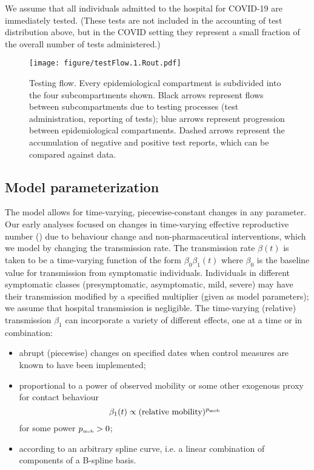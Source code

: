 \documentclass[12pt]{article}\usepackage[]{graphicx}\usepackage[]{color}
\begin{document}
We assume that all individuals admitted to the hospital for COVID-19 are immediately tested. (These tests are not included in the accounting of test distribution above, but in the COVID setting they represent a small fraction of the overall number of tests administered.)

\begin{figure}
  \texttt{[image: figure/testFlow.1.Rout.pdf]}
  \caption{Testing flow. Every epidemiological compartment is subdivided into the four subcompartments shown.
    Black arrows represent flows between subcompartments due to testing processes (test administration, reporting of tests); blue arrows represent progression between epidemiological compartments.
    Dashed arrows represent the accumulation of negative and positive test reports, which can be compared against data.
    }
  \label{fig:testing_flow}
\end{figure}

\subsection*{Model parameterization}

The model allows for time-varying, piecewise-constant changes in any parameter. 
Our early analyses focused on changes in time-varying effective reproductive number (\Rt) due to behaviour change and non-pharmaceutical interventions, which we model by changing the transmission rate.
The transmission rate $\beta(t)$ is taken to be a time-varying function of the form $\beta_0 \beta_1(t)$ where $\beta_0$ is the baseline value for transmission from symptomatic individuals.
Individuals in different symptomatic classes (presymptomatic, asymptomatic, mild, severe) may have their transmission modified by a specified multiplier (given as model parameters); we assume that hospital transmission is negligible.
The time-varying (relative) transmission $\beta_1$ can incorporate a variety of different effects, one at a time or in combination:
\begin{itemize}
\item abrupt (piecewise) changes on specified dates when control measures are known to have been implemented;
\item proportional to a power of observed mobility or some other exogenous proxy for contact behaviour
\[
  \beta_1(t) \propto (\textrm{relative mobility})^{{{p}_{\textrm{\tiny mob}}}}
\]
for some power ${{p}_{\textrm{\tiny mob}}}>0$;
\item according to an arbitrary spline curve, i.e. a linear combination of components of a B-spline basis.
\end{itemize}
\end{document}
